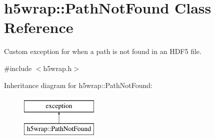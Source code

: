 \hypertarget{classh5wrap_1_1_path_not_found}{\section{h5wrap\+:\+:Path\+Not\+Found Class Reference}
\label{classh5wrap_1_1_path_not_found}
}


Custom exception for when a path is not found in an H\+D\+F5 file.  




{\ttfamily \#include $<$h5wrap.\+h$>$}

Inheritance diagram for h5wrap\+:\+:Path\+Not\+Found\+:\begin{figure}[H]
\begin{center}
\leavevmode
\includegraphics[height=2.000000cm]{classh5wrap_1_1_path_not_found}
\end{center}
\end{figure}
